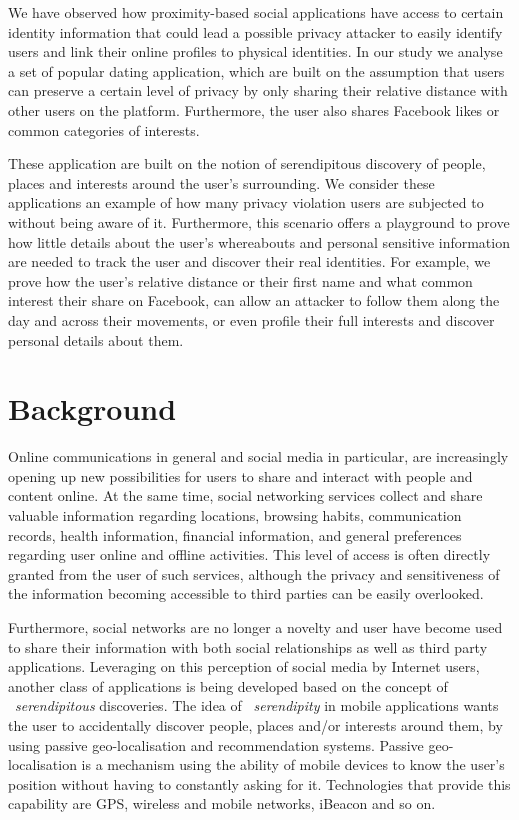 We have observed how proximity-based social applications have access to certain identity information that could lead a possible privacy attacker to easily identify users and link their online profiles to physical identities. In our study we analyse a set of popular dating application, which are built on the assumption that users can preserve a certain level of privacy by only sharing their relative distance with other users on the platform. Furthermore, the user also shares Facebook likes or common categories of interests.

These application are built on the notion of serendipitous discovery of people, places and interests around the user's surrounding.  We consider these applications an example of how many privacy violation users are subjected to without being aware of it. Furthermore, this scenario offers a playground to prove how little details about the user's whereabouts and personal sensitive information are needed to track the user and discover their real identities.  For example, we prove how the user's relative distance or their first name and what common interest their share on Facebook, can allow an attacker to follow them along the day and across their movements, or even profile their full interests and discover personal details about them.

\section{Background}
\noindent
Online communications in general and social media in particular, are increasingly opening up new possibilities for users to share and interact with people and content online. At the same time, social networking services collect and share valuable information regarding locations, browsing habits, communication records, health information, financial information, and general preferences regarding user online and offline activities. This level of access is often directly granted from the user of such services, although the privacy and sensitiveness of the information becoming accessible to third parties can be easily overlooked.

Furthermore, social networks are no longer a novelty and user have become used to share their information with both social relationships as well as third party applications. Leveraging on this perception of social media by Internet users, another class of applications is being developed based on the concept of ~\emph{serendipitous} discoveries. The idea of ~\emph{serendipity} in mobile applications wants the user to accidentally discover people, places and/or interests around them, by using passive geo-localisation and recommendation systems. Passive geo-localisation is a mechanism using the ability of mobile devices to know the user's position without having to constantly asking for it. Technologies that provide this capability are GPS, wireless and mobile networks, iBeacon and so on.

